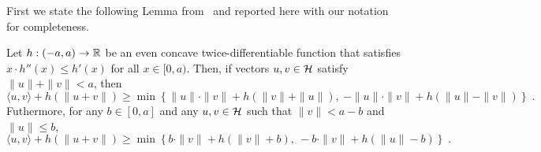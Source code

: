 First we state the following Lemma from~\cite{McMahanO14} and reported here with our notation for completeness.
\begin{lemma}[Extremes]
\label{lemma:extremes}
Let $h:(-a,a) \to \mathbb{R}$ be an even concave twice-differentiable function that
satisfies $x \cdot h''(x) \le h'(x)$ for all $x \in [0,a)$. Then, if vectors
$u,v \in \mathcal{H}$ satisfy $\|u\| + \|v\| < a$, then
\begin{equation}
\label{equation:lemma-extremes-1}
\langle u, v \rangle + h(\|u + v\|) \ge \min \left\{ \|u\| \cdot \|v\| + h(\|v\| + \|u\|), \ - \|u\| \cdot \|v\| + h(\|u\| - \|v\|) \right\} \; .
\end{equation}
Futhermore, for any $b \in [0,a]$ and any $u, v \in \mathcal{H}$ such that $\|v\| < a - b$ and $\|u\| \le b$,
\begin{equation}
\label{equation:lemma-extremes-2}
\langle u, v \rangle + h(\|u + v\|) \ge \min \left\{ b \cdot \|v\| + h(\|v\| + b), \ - b \cdot \|v\| + h(\|u\| - b) \right\} \; .
\end{equation}
\end{lemma}
%
